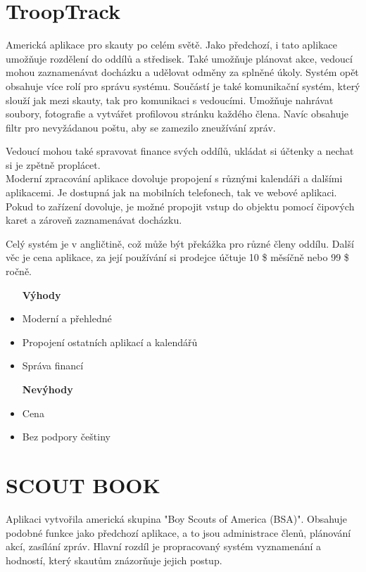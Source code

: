 \documentclass[twoside]{ctuthesis}
\begin{document}
\section{TroopTrack}
Americká aplikace pro skauty po celém světě. Jako předchozí, i tato aplikace umožňuje rozdělení do oddílů a středisek. Také umožňuje plánovat akce, vedoucí mohou zaznamenávat docházku a udělovat odměny za splněné úkoly. Systém opět obsahuje více rolí pro správu systému. Součástí je také komunikační systém, který slouží jak mezi skauty, tak pro komunikaci s vedoucími. Umožňuje nahrávat soubory, fotografie a vytvářet profilovou stránku každého člena. Navíc obsahuje filtr pro nevyžádanou poštu, aby se zamezilo zneužívání zpráv.

Vedoucí mohou také spravovat finance svých oddílů, ukládat si účtenky a nechat si je zpětně proplácet. \\
Moderní zpracování aplikace dovoluje propojení s různými kalendáři a dalšími aplikacemi. Je dostupná jak na mobilních telefonech, tak ve webové aplikaci. Pokud to zařízení dovoluje, je možné propojit vstup do objektu pomocí čipových karet a zároveň zaznamenávat docházku.

Celý systém je v angličtině, což může být překážka pro různé členy oddílu. Další věc je cena aplikace, za její používání si prodejce účtuje 10 \$ měsíčně nebo 99 \$ ročně.

\begin{itemize}
\setlength{\itemindent}{0.7cm}
    \item [\textbf{Výhody}]
    \item Moderní a přehledné
    \item Propojení ostatních aplikací a kalendářů
    \item Správa financí
\end{itemize}
\begin{itemize}
\setlength{\itemindent}{1.1cm}
    \item [\textbf{Nevýhody}]
    \setlength{\itemindent}{0.7cm}
    \item Cena
    \item Bez podpory češtiny
\end{itemize}

\section{SCOUT BOOK}
Aplikaci vytvořila americká skupina "Boy Scouts of America (BSA)". Obsahuje podobné funkce jako předchozí aplikace, a to jsou administrace členů, plánování akcí, zasílání zpráv. Hlavní rozdíl je propracovaný systém vyznamenání a hodností, který skautům znázorňuje jejich postup.
\end{document}
